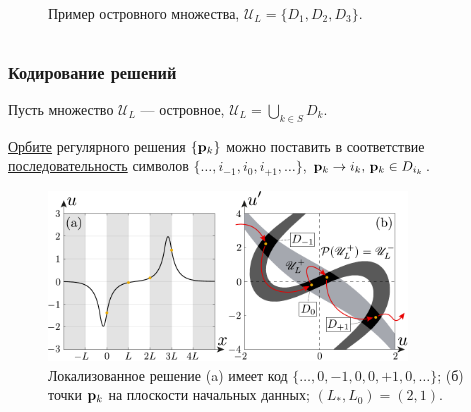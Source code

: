\documentclass [10pt] {beamer}
\begin{document}
\begin{frame}
\begin{columns}[T]
\begin{column}{.46\textwidth}
\begin{figure}
			\caption{Пример островного множества, $\mathscr{U}_L = \{ D_1, D_2, D_3 \}$.}
			\end{figure}
		\end{column}
	\end{columns}
\end{frame}

\begin{frame}
	\frametitle{Кодирование решений}
	
	Пусть множество $\mathscr{U}_L$ --- островное, $\mathscr{U}_L = \bigcup_{k \in S} D_k$.
	
	\vspace{5pt}
	
	\underline{Орбите} регулярного решения $\{ \vb{p}_k \}$ можно поставить в соответствие \underline{последовательность} символов $\{ \dots, i_{-1}, i_0, i_{+1}, \dots \}$, $\vb{p}_k \to i_k, \, \vb{p}_k \in D_{i_k}$.
	\begin{figure}
	\includegraphics[width = 0.85\textwidth]{pic/solution and orbit on the phase plane.pdf}
	\caption{
		Локализованное решение (a) имеет код $\{ \dots, 0, -1, 0, 0, +1, 0, \dots \}$; (б) точки $\vb{p}_k$ на плоскости начальных данных; $(L_*, L_0) = (2, 1)$.
	}
	\end{figure}
\end{frame}
\end{document}
